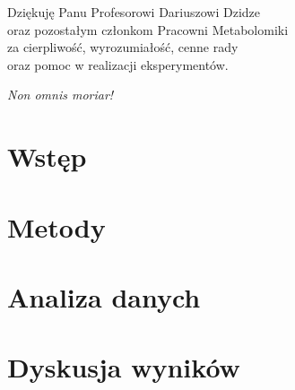 \documentclass[12pt, a4paper]{article}
\begin{document}


\newpage
\thispagestyle{empty}
\begin{flushright}
    Dziękuję Panu Profesorowi Dariuszowi Dzidze\\
    oraz pozostałym członkom Pracowni Metabolomiki\\
    za cierpliwość, wyrozumiałość, cenne rady\\
    oraz pomoc w realizacji eksperymentów.
\end{flushright}
\vspace*{\fill}
\begin{flushleft}
    \textit{Non omnis moriar!}
\end{flushleft}


\newpage
\setcounter{page}{3}

\tableofcontents



\section{Wstęp}\label{sec:wstep}


\section{Metody}\label{sec:metody}


\section{Analiza danych}\label{sec:analiza-danych}


\section{Dyskusja wyników}\label{sec:dyskusja}


\begin{otherlanguage}{polish}
    \newpage
    \thispagestyle{empty}
    
    
\end{otherlanguage}

\newpage

\end{document}
